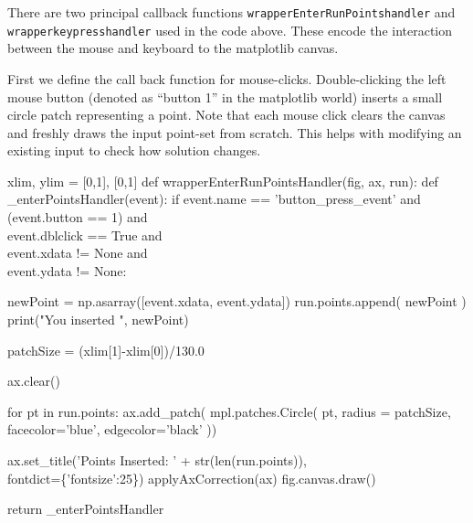 There are two principal callback functions \verb|wrapperEnterRunPointshandler| and \verb|wrapperkeypresshandler| used in the code above. 
These encode the interaction between the mouse and keyboard to the matplotlib canvas. 

First we define the call back function for mouse-clicks. Double-clicking the left mouse button (denoted as ``button 1'' in the matplotlib world)
inserts a small circle patch representing a point. Note that each mouse click 
clears the canvas
and freshly draws the input point-set from scratch. 
This helps with modifying an existing input to check how solution changes. 

\nwenddocs{}\plusendmoddef\nwstartdeflinemarkup{}\nwenddeflinemarkup
xlim, ylim = [0,1], [0,1]
def wrapperEnterRunPointsHandler(fig, ax, run):
    def _enterPointsHandler(event):
        if event.name      == 'button_press_event'     and \\
           (event.button   == 1)                       and \\
            event.dblclick == True                     and \\
            event.xdata  != None                       and \\
            event.ydata  != None:

             newPoint = np.asarray([event.xdata, event.ydata])
             run.points.append( newPoint  )
             print("You inserted ", newPoint)

             patchSize  = (xlim[1]-xlim[0])/130.0
                   
             ax.clear()

             for pt in run.points:
                  ax.add_patch( mpl.patches.Circle( pt, radius = patchSize,
                                                    facecolor='blue', edgecolor='black'  ))

             ax.set_title('Points Inserted: ' + str(len(run.points)), \\
                           fontdict=\{'fontsize':25\})
             applyAxCorrection(ax)
             fig.canvas.draw()

    return _enterPointsHandler
\nwendcode{}\nwdocspar

